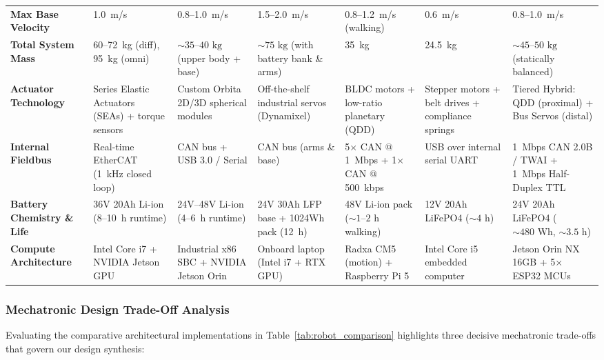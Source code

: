 \begin{table}[htbp]
\begin{tabularx}{\textwidth}{@{}lYYYYYY@{}}
\addlinespace[0.2em]
\textbf{Max Base Velocity} & 1.0~m/s & 0.8--1.0~m/s & 1.5--2.0~m/s & 0.8--1.2~m/s (walking) & 0.6~m/s & 0.8--1.0~m/s \\
\addlinespace[0.2em]
\textbf{Total System Mass} & 60--72~kg (diff), 95~kg (omni) & $\sim 35\text{--}40\text{ kg}$ (upper body + base) & $\sim 75\text{ kg}$ (with battery bank \& arms) & 35~kg & 24.5~kg & $\sim 45\text{--}50\text{ kg}$ (statically balanced) \\
\addlinespace[0.2em]
\textbf{Actuator Technology} & Series Elastic Actuators (SEAs) + torque sensors & Custom Orbita 2D/3D spherical modules & Off-the-shelf industrial servos (Dynamixel) & BLDC motors + low-ratio planetary (QDD) & Stepper motors + belt drives + compliance springs & Tiered Hybrid: QDD (proximal) + Bus Servos (distal) \\
\addlinespace[0.2em]
\textbf{Internal Fieldbus} & Real-time EtherCAT (1~kHz closed loop) & CAN bus + USB 3.0 / Serial & CAN bus (arms \& base) & 5$\times$ CAN @ 1~Mbps + 1$\times$ CAN @ 500~kbps & USB over internal serial UART & 1~Mbps CAN 2.0B / TWAI + 1~Mbps Half-Duplex TTL \\
\addlinespace[0.2em]
\textbf{Battery Chemistry \& Life} & 36V 20Ah Li-ion (8--10~h runtime) & 24V--48V Li-ion (4--6~h runtime) & 24V 30Ah LFP base + 1024Wh pack (12~h) & 48V Li-ion pack ($\sim 1\text{--}2\text{ h}$ walking) & 12V 20Ah LiFePO4 ($\sim 4\text{ h}$) & 24V 20Ah LiFePO4 ($\sim 480\text{ Wh}$, $\sim 3.5\text{ h}$) \\
\addlinespace[0.2em]
\textbf{Compute Architecture} & Intel Core i7 + NVIDIA Jetson GPU & Industrial x86 SBC + NVIDIA Jetson Orin & Onboard laptop (Intel i7 + RTX GPU) & Radxa CM5 (motion) + Raspberry Pi 5 & Intel Core i5 embedded computer & Jetson Orin NX 16GB + 5$\times$ ESP32 MCUs \\
\bottomrule
\end{tabularx}
\end{table}

\subsubsection{Mechatronic Design Trade-Off Analysis}
Evaluating the comparative architectural implementations in Table~\ref{tab:robot_comparison} highlights three decisive mechatronic trade-offs that govern our design synthesis:

